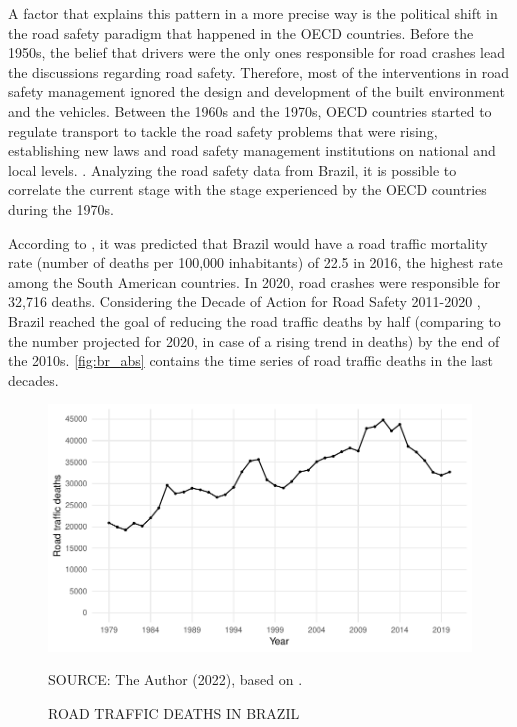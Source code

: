 A factor that explains this pattern in a more precise way is the political shift in the road safety paradigm that happened in the OECD countries. Before the 1950s, the belief that drivers were the only ones responsible for road crashes lead the discussions regarding road safety. Therefore, most of the interventions in road safety management ignored the design and development of the built environment and the vehicles. Between the 1960s and the 1970s, OECD countries started to regulate transport to tackle the road safety problems that were rising, establishing new laws and road safety management institutions on national and local levels. \cite{Bhalla2016}. Analyzing the road safety data from Brazil, it is possible to correlate the current stage with the stage experienced by the OECD countries during the 1970s.

According to \textcite{WHO2018}, it was predicted that Brazil would have a road traffic mortality rate (number of deaths per 100,000 inhabitants) of 22.5 in 2016, the highest rate among the South American countries. In 2020, road crashes were responsible for 32,716 deaths. Considering the Decade of Action for Road Safety 2011-2020 \cite{WHO2011}, Brazil reached the goal of reducing the road traffic deaths by half (comparing to the number projected for 2020, in case of a rising trend in deaths) by the end of the 2010s. \autoref{fig:br_abs} contains the time series of road traffic deaths in the last decades.  

\begin{figure}[!htbp]
    \centering\footnotesize
    \captionsetup{font=footnotesize}
    \caption{ROAD TRAFFIC DEATHS IN BRAZIL}
    \includegraphics{fig/brazil_abs.pdf}
    \label{fig:br_abs}
    \par SOURCE: The Author (2022), based on \textcite{MinistryofHealth2022}.
\end{figure}

